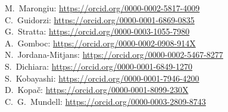 \documentclass{aa}
\begin{document}
M.~Marongiu: \url{https://orcid.org/0000-0002-5817-4009} \\
C.~Guidorzi: \url{https://orcid.org/0000-0001-6869-0835} \\
G.~Stratta: \url{https://orcid.org/0000-0003-1055-7980} \\
A.~Gomboc: \url{https://orcid.org/0000-0002-0908-914X} \\
N.~Jordana-Mitjans: \url{https://orcid.org/0000-0002-5467-8277} \\
S.~Dichiara: \url{https://orcid.org/0000-0001-6849-1270} \\
S.~Kobayashi: \url{https://orcid.org/0000-0001-7946-4200} \\
D.~Kopa{\v c}: \url{https://orcid.org/0000-0001-8099-230X} \\
C.~G.~Mundell: \url{https://orcid.org/0000-0003-2809-8743} \\



\end{document}
